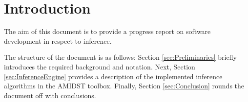 \section{Introduction}

The aim of this document is to provide a progress report on software development in respect to inference.

The structure of the document is as follows: Section \ref{sec:Preliminaries} briefly introduces the required background and notation. Next, Section \ref{sec:InferenceEngine} provides a description of the implemented inference algorithms in the AMIDST toolbox. Finally, Section \ref{sec:Conclusion} rounds the document off with conclusions. 
